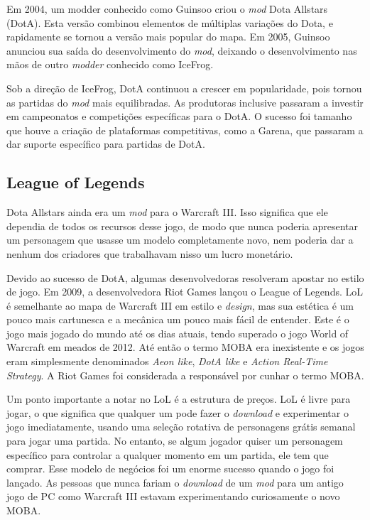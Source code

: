 Em 2004, um modder conhecido como Guinsoo criou o \textit{mod} Dota Allstars (DotA). Esta versão combinou elementos de múltiplas variações do Dota, e rapidamente se tornou a versão mais popular do mapa. Em 2005, Guinsoo anunciou sua saída do desenvolvimento do \textit{mod}, deixando o desenvolvimento nas mãos de outro \textit{modder} conhecido como IceFrog.

Sob a direção de IceFrog, DotA continuou a crescer em popularidade, pois tornou as partidas do \textit{mod} mais equilibradas. As produtoras inclusive passaram a investir em campeonatos e competições específicas para o DotA. O sucesso foi tamanho que houve a criação de plataformas competitivas, como a Garena, que passaram a dar suporte específico para partidas de DotA.

\subsection{League of Legends}
Dota Allstars ainda era um \textit{mod} para o Warcraft III. Isso significa que ele dependia de todos os recursos desse jogo, de modo que nunca poderia apresentar um personagem que usasse um modelo completamente novo, nem poderia dar a nenhum dos criadores que trabalhavam nisso um lucro monetário.

Devido ao sucesso de DotA, algumas desenvolvedoras resolveram apostar no estilo de jogo. Em 2009, a desenvolvedora Riot Games lançou o League of Legends. LoL é semelhante ao mapa de Warcraft III em estilo e \textit{design}, mas sua estética é um pouco mais cartunesca e a mecânica um pouco mais fácil de entender. Este é o jogo mais jogado do mundo até os dias atuais, tendo superado o jogo World of Warcraft em meados de 2012. Até então o termo MOBA era inexistente e os jogos eram simplesmente denominados \textit{Aeon like}, \textit{DotA like} e \textit{Action Real-Time Strategy}. A Riot Games foi considerada a responsável por cunhar o termo MOBA.

Um ponto importante a notar no LoL é a estrutura de preços. LoL é livre para jogar, o que significa que qualquer um pode fazer o \textit{download} e experimentar o jogo imediatamente, usando uma seleção rotativa de personagens grátis semanal para jogar uma partida. No entanto, se algum jogador quiser um personagem específico para controlar a qualquer momento em um partida, ele tem que comprar. Esse modelo de negócios foi um enorme sucesso quando o jogo foi lançado. As pessoas que nunca fariam o \textit{download} de um \textit{mod} para um antigo jogo de PC como Warcraft III estavam experimentando curiosamente o novo MOBA.


